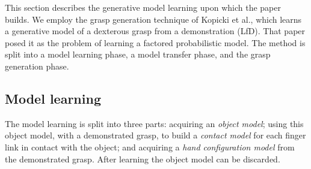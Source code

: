 This section describes the generative model learning upon which the paper builds. We employ the grasp generation technique of Kopicki et al.\cite{kopicki2015ijrr}, which learns a generative model of a dexterous grasp from a demonstration (LfD). That paper posed it as the problem of learning a factored probabilistic model. The method is split into a model learning phase, a model transfer phase, and the grasp generation phase. 

\subsection{Model learning}
The model learning is split into three parts: acquiring an {\em object model}; using this object model, with a demonstrated grasp, to build a {\em contact model} for each finger link in contact with the object; and acquiring a {\em hand configuration model} from the demonstrated grasp. After learning the object model can be discarded.

